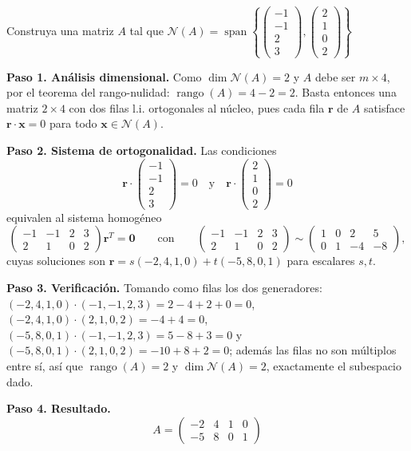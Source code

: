 \begin{example}
Construya una matriz $A$ tal que $\mathcal{N}(A) = \operatorname{span}\left\{ \begin{pmatrix}-1\\-1\\2\\3\end{pmatrix}, \begin{pmatrix}2\\1\\0\\2\end{pmatrix} \right\}$

\begin{myproof}
\textbf{Paso 1. Análisis dimensional.} Como $\dim \mathcal{N}(A) = 2$ y $A$ debe ser $m \times 4$, por el teorema del rango-nulidad: $\operatorname{rango}(A) = 4 - 2 = 2$. Basta entonces una matriz $2\times 4$ con dos filas l.i. ortogonales al núcleo, pues cada fila $\mathbf{r}$ de $A$ satisface $\mathbf{r}\cdot\mathbf{x}=0$ para todo $\mathbf{x}\in\mathcal{N}(A)$.

\textbf{Paso 2. Sistema de ortogonalidad.} Las condiciones
$$\mathbf{r} \cdot \begin{pmatrix}-1\\-1\\2\\3\end{pmatrix} = 0 \quad \text{y} \quad \mathbf{r} \cdot \begin{pmatrix}2\\1\\0\\2\end{pmatrix} = 0$$
equivalen al sistema homogéneo
$$\begin{pmatrix}-1 & -1 & 2 & 3 \\ 2 & 1 & 0 & 2\end{pmatrix} \mathbf{r}^T = \mathbf{0}
\qquad\text{con}\qquad
\begin{pmatrix}-1 & -1 & 2 & 3 \\ 2 & 1 & 0 & 2\end{pmatrix} \sim \begin{pmatrix}1 & 0 & 2 & 5 \\ 0 & 1 & -4 & -8\end{pmatrix},$$
cuyas soluciones son $\mathbf{r} = s(-2,4,1,0) + t(-5,8,0,1)$ para escalares $s,t$.

\textbf{Paso 3. Verificación.} Tomando como filas los dos generadores: $(-2,4,1,0)\cdot(-1,-1,2,3) = 2-4+2+0 = 0$, $(-2,4,1,0)\cdot(2,1,0,2) = -4+4 = 0$, $(-5,8,0,1)\cdot(-1,-1,2,3) = 5-8+3 = 0$ y $(-5,8,0,1)\cdot(2,1,0,2) = -10+8+2 = 0$; además las filas no son múltiplos entre sí, así que $\operatorname{rango}(A)=2$ y $\dim\mathcal{N}(A)=2$, exactamente el subespacio dado.

\textbf{Paso 4. Resultado.}
$$\boxed{A = \begin{pmatrix} -2 & 4 & 1 & 0 \\ -5 & 8 & 0 & 1 \end{pmatrix}}$$
\end{myproof}
\end{example}

